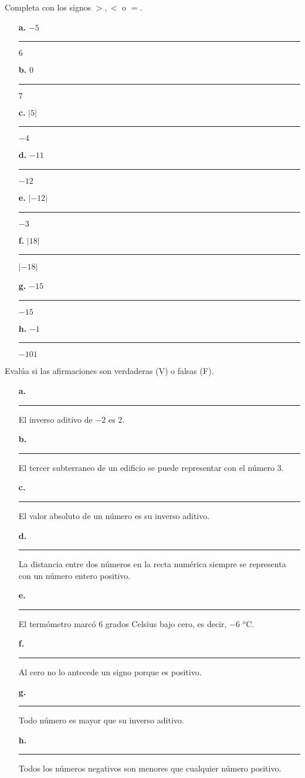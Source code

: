 \documentclass[spanish,letterpaper, 11pt, addpoints, answers]{exam}
\begin{document}
\begin{questions}

\question Completa con los signos $>,<$ o $=$.

\begin{multicols}{2}

\begin{itemize}
  \item[\textbf{a.}] $-5$ \rule{1cm}{0.4pt} $6$
  \item[\textbf{b.}] $0$ \rule{1cm}{0.4pt} $7$
  \item[\textbf{c.}] $|5|$ \rule{1cm}{0.4pt} $-4$
  \item[\textbf{d.}] $-11$ \rule{1cm}{0.4pt} $-12$
  \item[\textbf{e.}] $|-12|$ \rule{1cm}{0.4pt} $-3$
  \item[\textbf{f.}] $|18|$ \rule{1cm}{0.4pt} $|-18|$
  \item[\textbf{g.}] $-15$ \rule{1cm}{0.4pt} $-15$
  \item[\textbf{h.}] $-1$ \rule{1cm}{0.4pt} $-101$
\end{itemize}
\end{multicols}

\question Evalúa si las afirmaciones son verdaderas (V) o falsas (F).

  \begin{itemize}
  \item[\textbf{a.}]\rule{1cm}{0.4pt} El inverso aditivo de $-2$ es $2$.
  \item[\textbf{b.}]\rule{1cm}{0.4pt} El tercer subterraneo de un edificio se puede representar con el número $3$.
  \item[\textbf{c.}]\rule{1cm}{0.4pt} El valor absoluto de un número es su inverso aditivo.
  \item[\textbf{d.}]\rule{1cm}{0.4pt} La distancia entre dos números en la recta numérica siempre se representa con un número entero positivo.
  \item[\textbf{e.}]\rule{1cm}{0.4pt} El termómetro marcó 6 grados Celsius bajo cero, es decir, $-6$ $ ^o$C.
  \item[\textbf{f.}]\rule{1cm}{0.4pt} Al cero no lo antecede un signo porque es positivo.
  \item[\textbf{g.}]\rule{1cm}{0.4pt} Todo número es mayor que su inverso aditivo.
  \item[\textbf{h.}]\rule{1cm}{0.4pt} Todos los números negativos son menores que cualquier número positivo. 
  \end{itemize}


\end{questions}
\end{document}
